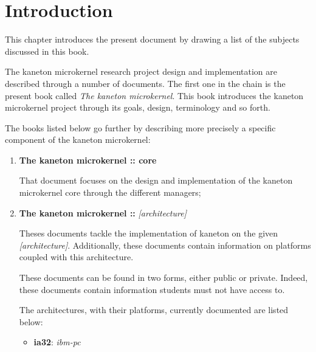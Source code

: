 %
%
%
%
%
%

%
%

\chapter{Introduction}

This chapter introduces the present document by drawing a list of the subjects
discussed in this book.

\newpage

%
%

The kaneton microkernel research project design and implementation are
described through a number of documents. The first one in the chain is
the present book called \textit{The kaneton microkernel}. This book introduces
the kaneton microkernel project through its goals, design, terminology and so
forth.

The books listed below go further by describing more precisely a specific
component of the kaneton microkernel:

\begin{enumerate}
  \item
    \textbf{The kaneton microkernel :: core}

    \-

    That document focuses on the design and implementation of the kaneton
    microkernel core through the different managers;
  \item
    \textbf{The kaneton microkernel :: }\textit{[architecture]}

    \-

    Theses documents tackle the implementation of kaneton on the given
    \textit{[architecture]}. Additionally, these documents contain information
    on platforms coupled with this architecture.

    \-

    These documents can be found in two forms, either public or private.
    Indeed, these documents contain information students must not have
    access to.

    \-

    The architectures, with their platforms, currently documented are
    listed below:

    \begin{itemize}
      \item
	\textbf{ia32}: \textit{ibm-pc}
    \end{itemize}
\end{enumerate}
